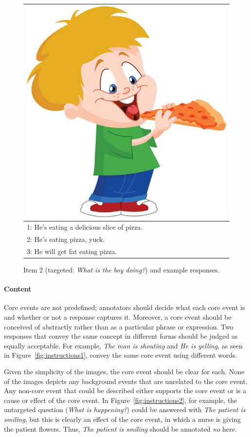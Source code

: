 \documentclass[12pt,notitlepage]{article}
\begin{document}
\begin{figure}[htb!]
\begin{center}
\begin{tabular}{|l|}
\hline
\includegraphics[width=0.4\columnwidth,trim=0 0 0 -3]{../figures/I02.jpg}\\
\hline
1: He's eating a delicious slice of pizza. \\
\hline
2: He's eating pizza, yuck. \\
\hline
3: He will get fat eating pizza. \\
\hline
\end{tabular}
\end{center}
\caption{Item 2 (targeted: \textit{What is the boy doing?}) and example responses.}
\label{fig:eat-pizza}
\end{figure}

\paragraph{Content}
Core events are not predefined; annotators should decide what each core event is and whether or not a response captures it. Moreover, a core event should be conceived of abstractly rather than as a particular phrase or expression. Two responses that convey the same concept in different forms should be judged as equally acceptable. For example, \textit{The man is shouting} and \textit{He is yelling}, as seen in Figure~\ref{fig:instructions1}, convey the same core event using different words.

Given the simplicity of the images, the core event should be clear for each. None of the images depicts any background events that are unrelated to the core event. Any non-core event that could be described either supports the core event or is a cause or effect of the core event. In Figure~\ref{fig:instructions2}, for example, the untargeted question (\textit{What is happening?}) could be answered with \textit{The patient is smiling}, but this is clearly an effect of the core event, in which a nurse is giving the patient flowers. Thus, \textit{The patient is smiling} should be annotated \textit{no} here.
\end{document}
